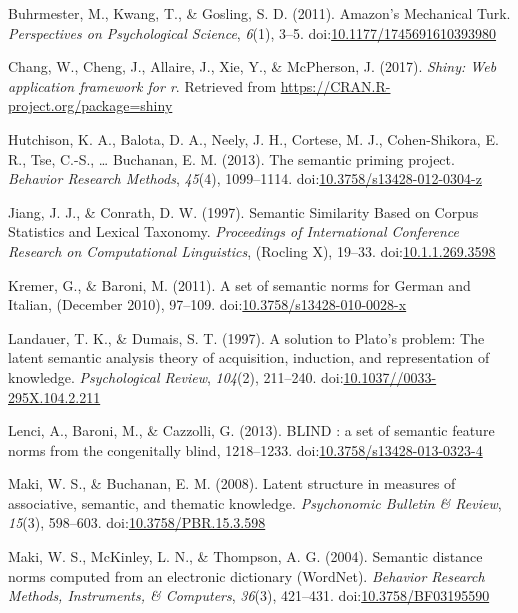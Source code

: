 \documentclass[english,man]{apa6}
\theoremstyle{definition}
\theoremstyle{definition}
\theoremstyle{definition}
\theoremstyle{remark}
\begin{document}
\hypertarget{ref-Buhrmester2011}{}
Buhrmester, M., Kwang, T., \& Gosling, S. D. (2011). Amazon's Mechanical
Turk. \emph{Perspectives on Psychological Science}, \emph{6}(1), 3--5.
doi:\href{https://doi.org/10.1177/1745691610393980}{10.1177/1745691610393980}

\hypertarget{ref-R-shiny}{}
Chang, W., Cheng, J., Allaire, J., Xie, Y., \& McPherson, J. (2017).
\emph{Shiny: Web application framework for r}. Retrieved from
\url{https://CRAN.R-project.org/package=shiny}

\hypertarget{ref-Hutchison2013}{}
Hutchison, K. A., Balota, D. A., Neely, J. H., Cortese, M. J.,
Cohen-Shikora, E. R., Tse, C.-S., \ldots{} Buchanan, E. M. (2013). The
semantic priming project. \emph{Behavior Research Methods},
\emph{45}(4), 1099--1114.
doi:\href{https://doi.org/10.3758/s13428-012-0304-z}{10.3758/s13428-012-0304-z}

\hypertarget{ref-Jiang1997}{}
Jiang, J. J., \& Conrath, D. W. (1997). Semantic Similarity Based on
Corpus Statistics and Lexical Taxonomy. \emph{Proceedings of
International Conference Research on Computational Linguistics},
(Rocling X), 19--33.
doi:\href{https://doi.org/10.1.1.269.3598}{10.1.1.269.3598}

\hypertarget{ref-Kremer2011}{}
Kremer, G., \& Baroni, M. (2011). A set of semantic norms for German and
Italian, (December 2010), 97--109.
doi:\href{https://doi.org/10.3758/s13428-010-0028-x}{10.3758/s13428-010-0028-x}

\hypertarget{ref-Landauer1997}{}
Landauer, T. K., \& Dumais, S. T. (1997). A solution to Plato's problem:
The latent semantic analysis theory of acquisition, induction, and
representation of knowledge. \emph{Psychological Review}, \emph{104}(2),
211--240.
doi:\href{https://doi.org/10.1037//0033-295X.104.2.211}{10.1037//0033-295X.104.2.211}

\hypertarget{ref-Lenci2013}{}
Lenci, A., Baroni, M., \& Cazzolli, G. (2013). BLIND : a set of semantic
feature norms from the congenitally blind, 1218--1233.
doi:\href{https://doi.org/10.3758/s13428-013-0323-4}{10.3758/s13428-013-0323-4}

\hypertarget{ref-Maki2008}{}
Maki, W. S., \& Buchanan, E. M. (2008). Latent structure in measures of
associative, semantic, and thematic knowledge. \emph{Psychonomic
Bulletin \& Review}, \emph{15}(3), 598--603.
doi:\href{https://doi.org/10.3758/PBR.15.3.598}{10.3758/PBR.15.3.598}

\hypertarget{ref-Maki2004}{}
Maki, W. S., McKinley, L. N., \& Thompson, A. G. (2004). Semantic
distance norms computed from an electronic dictionary (WordNet).
\emph{Behavior Research Methods, Instruments, \& Computers},
\emph{36}(3), 421--431.
doi:\href{https://doi.org/10.3758/BF03195590}{10.3758/BF03195590}
\end{document}
